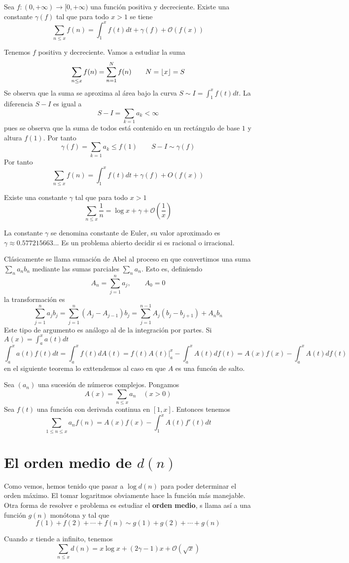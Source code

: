 \documentclass[TAN.tex]{subfiles}
\begin{document}
\begin{teorema}
Sea $f : (0,+\infty) \to [0,+\infty)$ una función positiva y decreciente. Existe una constante $γ(f)$ tal que para todo $x>1$ se tiene
\[ \sum_{n≤x} f(n) = \int_1^x f(t)dt + γ(f) + \mathcal{O}(f(x)) \]
\end{teorema}
\begin{dem}
Tenemos $f$ positiva y decreciente. Vamos a estudiar la suma
$$
\sum_{n\leq x}f(n) = \sum_{n=1}^N f(n) \qquad N=\left\lfloor{x}\right\rfloor= S
$$
Se observa que la suma se aproxima al área bajo la curva $S\sim I = \int_1^x f(t)dt$. La diferencia $S-I$ es igual a 
$$S-I = \sum_{k=1} a_k < \infty$$ pues se observa que la suma de todos está contenido en un rectángulo de base $1$ y altura $f(1)$. Por tanto
$$
\gamma(f) = \sum_{k=1} a_k \leq f(1) \qquad S - I \sim \gamma(f) 
$$
Por tanto
$$
\sum_{n\leq x} f(n) = \int_1^x f(t)dt + \gamma(f) + O(f(x))
$$
\QED
\end{dem}

\begin{teorema}
Existe una constante $γ$ tal que para todo $x>1$
\[ \sum_{n≤x} \frac{1}{n} = \log x + γ + \mathcal{O}\left(\frac{1}{x}\right) \]
\end{teorema}
La constante $γ$ se denomina constante de Euler, su valor aproximado es $γ \approx 0.577215663...$ Es un problema abierto decidir si es racional o irracional.

Clásicamente se llama sumación de Abel al proceso en que convertimos una suma $\sum_n a_n b_n$ mediante las sumas parciales $\sum_n a_n$. Esto es, definiendo
\[ A_n = \sum_{j=1}^n a_j, \qquad A_0 = 0 \]
la transformación es
\[ \sum_{j=1}^n a_j b_j = \sum_{j=1}^n (A_j-A_{j-1})b_j = \sum_{j=1}^{n-1} A_j(b_j-b_{j+1}) + A_n b_n \]
Este tipo de argumento es análogo al de la integración por partes. Si $A(x)=\int_a^x a(t)dt$
\[ \int_a^x a(t)f(t) dt = \int_a^x f(t) dA(t) = \left.f(t)A(t)\right|_a^x - \int_a^x A(t) df(t) = A(x)f(x) - \int_a^x A(t) df(t) \]
en el siguiente teorema lo exttendemos al caso en que $A$ es una funcón de salto.

\begin{teorema} Sea $(a_n)$ una sucesión de números complejos. Pongamos
\[ A(x) = \sum_{n≤x} a_n \quad (x > 0) \]
Sea $f(t)$ una función con derivada continua en $[1,x]$. Entonces tenemos
\[ \sum_{1≤n≤x} a_nf(n) = A(x)f(x)-\int_1^x A(t)f'(t)dt \]
\end{teorema}
\newpage
\section{El orden medio de $d(n)$}
Como vemos, hemos tenido que pasar a $\log d(n)$ para poder determinar el orden máximo. El tomar logaritmos obviamente hace la función más manejable. Otra forma de resolver e problema es estudiar el \textbf{orden medio}, s llama así a una función $g(n)$ monótona y tal que
\[ f(1) + f(2) + \cdots + f(n) \sim g(1) + g(2) + \cdots + g(n) \]
\begin{teorema}[Dirichlet]
Cuando $x$ tiende a infinito, tenemos
\[ \sum_{n≤x} d(n) = x \log x + (2γ -1)x + \mathcal{O}(\sqrt{x}) \]
\end{teorema}
\end{document}
